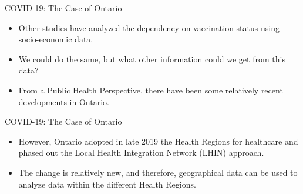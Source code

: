 \documentclass[
  ignorenonframetext,
]{beamer}
\begin{document}
\begin{frame}{COVID-19: The Case of Ontario}
\protect\hypertarget{covid-19-the-case-of-ontario-2}{}
\begin{itemize}[<+->]
\item
  Other studies have analyzed the dependency on vaccination status using
  socio-economic data.
\item
  We could do the same, but what other information could we get from
  this data?
\item
  From a Public Health Perspective, there have been some relatively
  recent developments in Ontario.
\end{itemize}
\end{frame}

\begin{frame}{COVID-19: The Case of Ontario}
\protect\hypertarget{covid-19-the-case-of-ontario-3}{}
\begin{itemize}[<+->]
\item
  However, Ontario adopted in late 2019 the Health Regions for
  healthcare and phased out the Local Health Integration Network (LHIN)
  approach.
\item
  The change is relatively new, and therefore, geographical data can be
  used to analyze data within the different Health Regions.
\end{itemize}
\end{frame}
\end{document}
